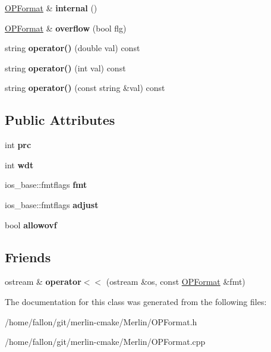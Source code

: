 \begin{DoxyCompactItemize}
\hyperlink{classOPFormat}{O\+P\+Format} \& {\bfseries internal} ()
\item 
\mbox{\label{classOPFormat_a0d94fd81acd41670888ce57908cfc6df}} 
\hyperlink{classOPFormat}{O\+P\+Format} \& {\bfseries overflow} (bool flg)
\item 
\mbox{\label{classOPFormat_a780e01e6c97d10ce43abbc4608d7cbeb}} 
string {\bfseries operator()} (double val) const
\item 
\mbox{\label{classOPFormat_a08f2c2b1784dc6814139cd887f401b2f}} 
string {\bfseries operator()} (int val) const
\item 
\mbox{\label{classOPFormat_a32477675c9e56b8b705bc2a33d62ac82}} 
string {\bfseries operator()} (const string \&val) const
\end{DoxyCompactItemize}
\subsection*{Public Attributes}
\begin{DoxyCompactItemize}
\item 
\mbox{\label{classOPFormat_a1a3da7ebfe7561a47688c8cdca9e288e}} 
int {\bfseries prc}
\item 
\mbox{\label{classOPFormat_aa2cd71fe888440f55d3187bc0dee2c0b}} 
int {\bfseries wdt}
\item 
\mbox{\label{classOPFormat_a758b76d2c686a534c57b7931d613b091}} 
ios\+\_\+base\+::fmtflags {\bfseries fmt}
\item 
\mbox{\label{classOPFormat_a467da17d13aa329a2a7da41c8d59e275}} 
ios\+\_\+base\+::fmtflags {\bfseries adjust}
\item 
\mbox{\label{classOPFormat_a4d5b0a27ab35802f5eb88d0fb3af3f3b}} 
bool {\bfseries allowovf}
\end{DoxyCompactItemize}
\subsection*{Friends}
\begin{DoxyCompactItemize}
\item 
\mbox{\label{classOPFormat_a97e83516f5d4bfec54c6f0aa5b6029e7}} 
ostream \& {\bfseries operator$<$$<$} (ostream \&os, const \hyperlink{classOPFormat}{O\+P\+Format} \&fmt)
\end{DoxyCompactItemize}


The documentation for this class was generated from the following files\+:\begin{DoxyCompactItemize}
\item 
/home/fallon/git/merlin-\/cmake/\+Merlin/O\+P\+Format.\+h\item 
/home/fallon/git/merlin-\/cmake/\+Merlin/O\+P\+Format.\+cpp\end{DoxyCompactItemize}
